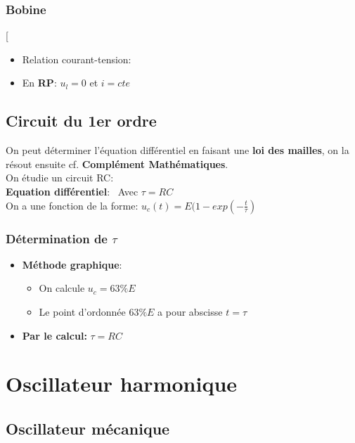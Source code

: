 \documentclass[12pt,hidelinks]{article}
\begin{document}
	\subsubsection{Bobine}
        \begin{DashedDefinition}{}[
        \begin{itemize}
            \item Relation courant-tension: 
            \item En \textbf{RP}: $u_l=0$ et $i=cte$
        \end{itemize}
        \end{DashedDefinition}
    \subsection{Circuit du 1er ordre}
    On peut déterminer l'équation différentiel en faisant une \textbf{loi des mailles}, on la résout ensuite
    cf. \textbf{Complément Mathématiques}. \\
    On étudie un circuit RC: \\
            \textbf{Equation différentiel}: 
            \ Avec $\tau=RC$ \\
    On a une fonction de la forme: $u_c(t)=E(1-exp(- \frac{t}{\tau})$
    \subsubsection{Détermination de $\tau$}
    \begin{itemize}
        \item \textbf{Méthode graphique}: 
        \begin{itemize}
            \item On calcule $u_c=63\% E$
            \item Le point d'ordonnée $63\% E$ a pour abscisse $t=\tau$
        \end{itemize}
        \item \textbf{Par le calcul:} $\tau=RC$
    \end{itemize}
\newpage
\section{Oscillateur harmonique}	
\vspace{3cm}
	\subsection{Oscillateur mécanique}
\end{document}
